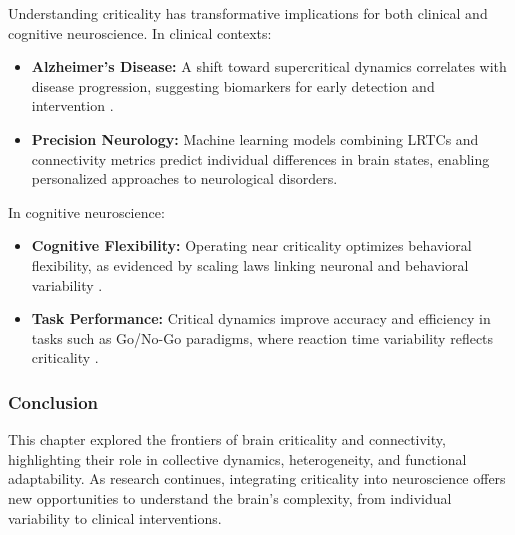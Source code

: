 Understanding criticality has transformative implications for both clinical and cognitive neuroscience. In clinical contexts:
\begin{itemize}
    \item \textbf{Alzheimer’s Disease:} A shift toward supercritical dynamics correlates with disease progression, suggesting biomarkers for early detection and intervention \cite{palva2013scaling}.
    \item \textbf{Precision Neurology:} Machine learning models combining LRTCs and connectivity metrics predict individual differences in brain states, enabling personalized approaches to neurological disorders.
\end{itemize}

In cognitive neuroscience:
\begin{itemize}
    \item \textbf{Cognitive Flexibility:} Operating near criticality optimizes behavioral flexibility, as evidenced by scaling laws linking neuronal and behavioral variability \cite{gilden1995scaling}.
    \item \textbf{Task Performance:} Critical dynamics improve accuracy and efficiency in tasks such as Go/No-Go paradigms, where reaction time variability reflects criticality \cite{linkenkaer2001scale}.
\end{itemize}

\subsubsection*{Conclusion}

This chapter explored the frontiers of brain criticality and connectivity, highlighting their role in collective dynamics, heterogeneity, and functional adaptability. As research continues, integrating criticality into neuroscience offers new opportunities to understand the brain’s complexity, from individual variability to clinical interventions.